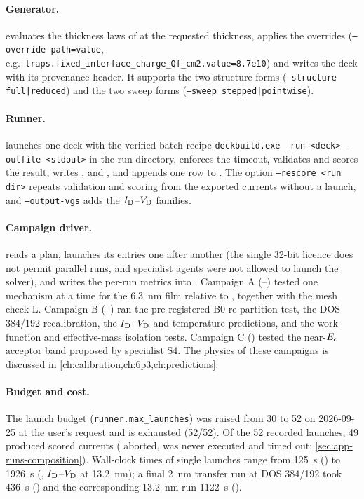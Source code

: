\paragraph{Generator.}  evaluates the thickness laws of
 at the requested thickness, applies the overrides
(\texttt{--override path=value}, e.g.\ \texttt{traps.fixed\_interface\_charge\_Qf\_cm2.value=8.7e10}) and writes the
deck with its provenance header. It supports the two structure forms (\texttt{--structure full|reduced}) and the two
sweep forms (\texttt{--sweep stepped|pointwise}).

\paragraph{Runner.}  launches one deck with the verified batch recipe
\texttt{deckbuild.exe -run <deck> -outfile <stdout>} in the run directory, enforces the timeout, validates and scores the
result, writes ,  and , and appends one row to
. The option \texttt{--rescore <run dir>} repeats validation and scoring from the exported
currents without a launch, and \texttt{--output-vgs} adds the $I_{\mathrm{D}}$--$V_{\mathrm{D}}$ families.

\paragraph{Campaign driver.}  reads a plan, launches its entries one after another (the
single 32-bit licence does not permit parallel runs, and specialist agents were not allowed to launch the solver), and
writes the per-run metrics into . Campaign A (--) tested one
mechanism at a time for the \SI{6.3}{nm} film relative to , together with the mesh check L. Campaign B
(--) ran the pre-registered B0 re-partition test, the DOS 384/192 recalibration, the $I_{\mathrm{D}}$--$V_{\mathrm{D}}$ and
temperature predictions, and the work-function and effective-mass isolation tests. Campaign C () tested the
near-$E_{\mathrm{c}}$ acceptor band proposed by specialist S4. The physics of these campaigns is discussed in
\cref{ch:calibration,ch:6p3,ch:predictions}.

\paragraph{Budget and cost.} The launch budget (\texttt{runner.max\_launches}) was raised from 30 to 52 on 2026-09-25 at
the user's request and is exhausted (52/52). Of the 52 recorded launches, 49 produced scored currents (
aborted,  was never executed and  timed out; \cref{sec:app-runs-composition}). Wall-clock times of
single launches range from \SI{125}{s} () to \SI{1926}{s} (, $I_{\mathrm{D}}$--$V_{\mathrm{D}}$ at \SI{13.2}{nm}); a final
\SI{2}{nm} transfer run at DOS 384/192 took \SI{436}{s} () and the corresponding \SI{13.2}{nm} run
\SI{1122}{s} ().

